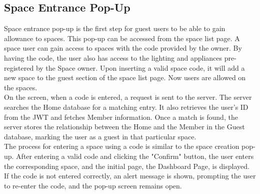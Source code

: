 \documentclass[conference]{IEEEtran}
\begin{document}
    \subsection{Space Entrance Pop-Up}
        Space entrance pop-up is the first step for guest users to be able to gain allowance to spaces. This pop-up can be accessed from the space list page.  A space user can gain access to spaces with the code provided by the owner. By having the code, the user also has access to the lighting and appliances pre-registered by the Space owner. Upon inserting a valid space code, it will add a new space to the guest section of the space list page. Now users are allowed on the spaces.\\
        On the screen, when a code is entered, a request is sent to the server. The server searches the Home database for a matching entry. It also retrieves the user's ID from the JWT and fetches Member information. Once a match is found, the server stores the relationship between the Home and the Member in the Guest database, marking the user as a guest in that particular space.\\
        The process for entering a space using a code is similar to the space creation pop-up. After entering a valid code and clicking the "Confirm" button, the user enters the corresponding space, and the initial page, the Dashboard Page, is displayed. If the code is not entered correctly, an alert message is shown, prompting the user to re-enter the code, and the pop-up screen remains open.
\end{document}
